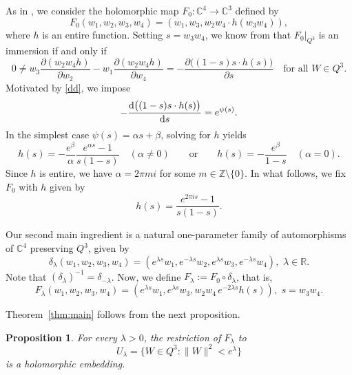 \documentclass[11pt,a4paper,reqno]{amsart}
\newtheorem{proposition}[theorem]{Proposition}
\begin{document}
As in \cite[(2.6), (2.15)]{Isaev2021}, we consider the holomorphic map $F_0:\mathbb C^4\to\mathbb C^3$ defined by
\begin{equation}\label{eq:F0}
F_0(w_1, w_2, w_3, w_4) =(w_1, w_3, w_2w_4\cdot h(w_3w_4)),
\end{equation}
where $h$ is an entire function. Setting \(s=w_3w_4\), we know from \cite[Lemma 2.1]{Isaev2021} that \(F_0|_{Q^3}\) is an immersion if and only if
\begin{equation*}
0\neq w_3\frac{\partial (w_2w_4 h)}{\partial w_2}-w_1\frac{\partial (w_2w_4 h)}{\partial w_4}
=-\frac{\partial \big((1-s)s\cdot h(s)\big)}{\partial s}
\quad\text{for all } W\in Q^3.
\end{equation*}
Motivated by \eqref{dd}, we impose
\begin{equation*}
-\frac{{\rm d} \big((1-s)s\cdot h(s)\big)}{{\rm d} s}=e^{\psi(s)}.
\end{equation*}
In the simplest case \(\psi(s)=\alpha s+\beta\),  solving for \(h\) yields
\begin{equation*}
h(s)=-\frac{e^\beta}{\alpha} \frac{e^{\alpha s}-1}{s(1-s)} \quad (\alpha\neq0)
\qquad\text{or}\qquad
h(s)=-\frac{e^\beta}{1-s} \quad (\alpha=0).
\end{equation*}
Since \(h\) is entire, we have \(\alpha=2\pi m i\) for some \(m\in\mathbb Z\setminus\{0\}\). In what follows, we fix $F_0$ with $h$ given by
\begin{equation}\label{eq:h}
 h(s)=\frac{e^{2\pi i s}-1}{s(1-s)}.
\end{equation}

Our second main ingredient is a natural one-parameter family of  automorphisms of $\mathbb C^4$ preserving $Q^3$, given by
\begin{equation}\label{eq:delta}
\delta_{\lambda}(w_1,w_2,w_3,w_4)=
\left(e^{\lambda s}w_1,e^{-\lambda s}w_2, e^{\lambda s}w_3,e^{-\lambda s}w_4\right), \,\,\lambda\in\mathbb R. 
\end{equation}
Note that $(\delta_{\lambda})^{-1}=\delta_{-\lambda}$. Now, we define $F_{\lambda}:=F_0\circ\delta_{\lambda}$, that is,
\begin{equation}%
 F_{\lambda}(w_1,w_2,w_3,w_4)=
 \left(e^{\lambda s}w_1,e^{\lambda s}w_3,       w_2w_4\,e^{-2\lambda s}h(s)\right),
 \,\, s=w_3w_4.
\end{equation}

Theorem~\ref{thm:main} follows from the next proposition.
\begin{proposition}\label{prop:tube}
For every $\lambda>0$, the restriction of $F_{\lambda}$ to
\[
 U_{\lambda}=\{W\in Q^3:\|W\|^2<e^{\lambda}\}
\]
is a holomorphic embedding.
\end{proposition}
\end{document}
